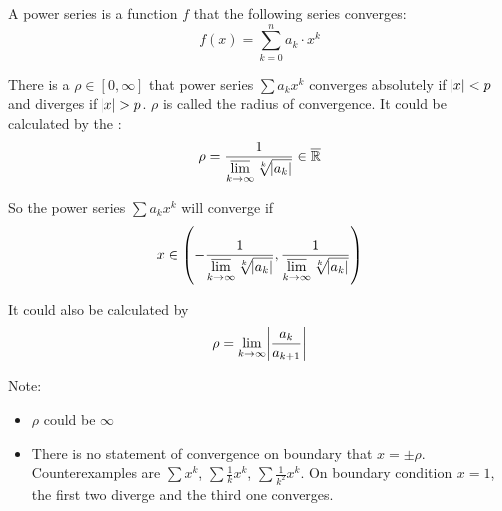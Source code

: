 \begin{definition}
    A power series is a function $f$ that the following series converges:
    \begin{equation}
        f(x) = \sum_{k=0}^n a_k \cdot x^k
    \end{equation}
\end{definition}

\begin{theorem}
    There is a $\rho \in [0, \infty]$ that power series $\sum a_k x^k$ converges absolutely if $\abs{x} < p$ and diverges if $\abs{x} > p$. $\rho$ is called the radius of convergence. It could be calculated by the :
    \begin{equation}
        \rho = \frac{1}{\displaystyle \varlimsup_{k \rightarrow \infty} \sqrt[k]{\abs{a_k}} } \in \overline{\mathbb{R}}
    \end{equation}
    
    So the power series $\sum a_k x^k$ will converge if
    \begin{equation}
        x \in \left(- \frac{1}{\displaystyle \varlimsup_{k \rightarrow \infty} \sqrt[k]{\abs{a_k}} }, \frac{1}{\displaystyle \varlimsup_{k \rightarrow \infty} \sqrt[k]{\abs{a_k}} } \right)
    \end{equation}
    
    It could also be calculated by 
    \begin{equation}
        \rho = \lim_{k \rightarrow \infty} \abs{\frac{a_k}{a_{k+1}}}
    \end{equation}
    
    Note:
    \begin{itemize}
        \item $\rho$ could be $\infty$
        \item There is no statement of convergence on boundary that $x = \pm \rho$. Counterexamples are $\sum x^k$, $\sum \frac{1}{k} x^k$, $\sum \frac{1}{k^2} x^k$. On boundary condition $x=1$, the first two diverge and the third one converges.
    \end{itemize}
    
     
\end{theorem}










